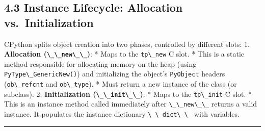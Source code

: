 \hypertarget{instance-lifecycle-allocation-vs.-initialization}{%
\subsection{4.3 Instance Lifecycle: Allocation
vs.~Initialization}\label{instance-lifecycle-allocation-vs.-initialization}}

CPython splits object creation into two phases, controlled by different
slots: 1. \textbf{Allocation (\passthrough{\lstinline!\_\_new\_\_!})}: *
Maps to the \passthrough{\lstinline!tp\_new!} C slot. * This is a static
method responsible for allocating memory on the heap (using
\passthrough{\lstinline!PyType\_GenericNew()!}) and initializing the
object's \passthrough{\lstinline!PyObject!} headers
(\passthrough{\lstinline!ob\_refcnt!} and
\passthrough{\lstinline!ob\_type!}). * Must return a new instance of the
class (or subclass). 2. \textbf{Initialization
(\passthrough{\lstinline!\_\_init\_\_!})}: * Maps to the
\passthrough{\lstinline!tp\_init!} C slot. * This is an instance method
called immediately after \passthrough{\lstinline!\_\_new\_\_!} returns a
valid instance. It populates the instance dictionary
\passthrough{\lstinline!\_\_dict\_\_!} with variables.

\begin{center}\rule{0.5\linewidth}{0.5pt}\end{center}
